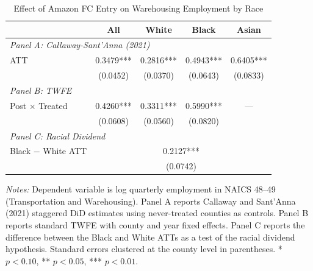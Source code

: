 \begin{table}[t]
\centering
\caption{Effect of Amazon FC Entry on Warehousing Employment by Race}
\label{tab:main_results}
\begin{threeparttable}
\begin{tabular}{lcccc}
\toprule
& All & White & Black & Asian \\
\midrule
\multicolumn{5}{l}{\textit{Panel A: Callaway-Sant'Anna (2021)}} \\[3pt]
\quad ATT & 0.3479*** & 0.2816*** & 0.4943*** & 0.6405*** \\
& (0.0452) & (0.0370) & (0.0643) & (0.0833) \\[6pt]
\multicolumn{5}{l}{\textit{Panel B: TWFE}} \\[3pt]
\quad Post $\times$ Treated & 0.4260*** & 0.3311*** & 0.5990*** & --- \\
& (0.0608) & (0.0560) & (0.0820) & \\[6pt]
\midrule
\multicolumn{5}{l}{\textit{Panel C: Racial Dividend}} \\[3pt]
\quad Black $-$ White ATT & \multicolumn{4}{c}{0.2127***} \\
& \multicolumn{4}{c}{(0.0742)} \\
\bottomrule
\end{tabular}
\begin{tablenotes}[flushleft]
\small
\item \textit{Notes:} Dependent variable is log quarterly employment in NAICS 48--49 (Transportation and Warehousing). Panel A reports Callaway and Sant'Anna (2021) staggered DiD estimates using never-treated counties as controls. Panel B reports standard TWFE with county and year fixed effects. Panel C reports the difference between the Black and White ATTs as a test of the racial dividend hypothesis. Standard errors clustered at the county level in parentheses. * $p < 0.10$, ** $p < 0.05$, *** $p < 0.01$.
\end{tablenotes}
\end{threeparttable}
\end{table}
